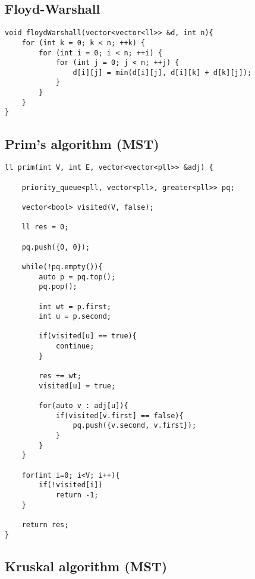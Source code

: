 \documentclass{article}
\begin{document}
\subsection{Floyd-Warshall}
\begin{lstlisting}
void floydWarshall(vector<vector<ll>> &d, int n){
    for (int k = 0; k < n; ++k) {
        for (int i = 0; i < n; ++i) {
            for (int j = 0; j < n; ++j) {
                d[i][j] = min(d[i][j], d[i][k] + d[k][j]); 
            }
        }
    }
}
\end{lstlisting}
\subsection{Prim's algorithm (MST)}
\begin{lstlisting}
ll prim(int V, int E, vector<vector<pll>> &adj) {
  
    priority_queue<pll, vector<pll>, greater<pll>> pq; 
    
    vector<bool> visited(V, false);
    
    ll res = 0;
    
    pq.push({0, 0});
    
    while(!pq.empty()){
        auto p = pq.top();
        pq.pop();
        
        int wt = p.first; 
        int u = p.second;
        
        if(visited[u] == true){
            continue; 
        }
        
        res += wt;
        visited[u] = true;
        
        for(auto v : adj[u]){
            if(visited[v.first] == false){
                pq.push({v.second, v.first});
            }
        }
    }

    for(int i=0; i<V; i++){
        if(!visited[i])
            return -1;
    }
    
    return res;
}
\end{lstlisting}
\subsection{Kruskal algorithm (MST)}
\end{document}
